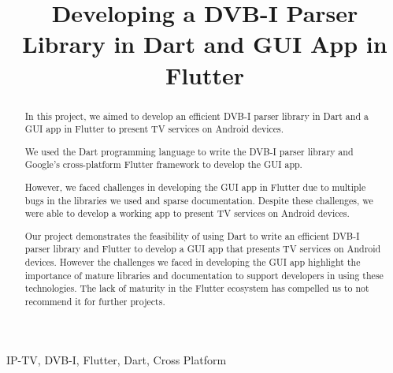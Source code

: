\documentclass[conference]{IEEEtran}
\begin{document}
\title{Developing a DVB-I Parser Library in Dart and GUI App in Flutter\\}

\author{
\and
{}
\and
{}
\and

}

\maketitle

\begin{abstract}
 In this project, we aimed to develop an efficient DVB-I parser library in Dart and a GUI app in Flutter to present TV services on Android devices.

We used the Dart programming language to write the DVB-I parser library and Google's cross-platform Flutter framework to develop the GUI app.

 However, we faced challenges in developing the GUI app in Flutter due to multiple bugs in the libraries we used and sparse documentation. Despite these challenges, we were able to develop a working app to present TV services on Android devices.

Our project demonstrates the feasibility of using Dart to write an efficient DVB-I parser library and Flutter to develop a GUI app that presents TV services on Android devices. However the challenges we faced in developing the GUI app highlight the importance of mature libraries and documentation to support developers in using these technologies. The lack of maturity in the Flutter ecosystem has compelled us to not recommend it for further projects.
\end{abstract}

\begin{IEEEkeywords}
IP-TV, DVB-I, Flutter, Dart, Cross Platform
\end{IEEEkeywords}
\end{document}

